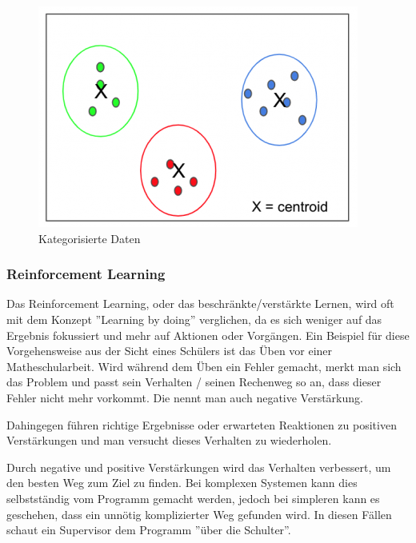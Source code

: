 \begin{figure}[H]
    \centering
    \includegraphics[scale=0.8]{sections/machine-learning/images/clustered-data.png}
    \caption{Kategorisierte Daten}
    \label{fig:clustered-data}
\end{figure}

\subsubsection{Reinforcement Learning}

Das Reinforcement Learning, oder das beschränkte/verstärkte Lernen, wird oft mit dem Konzept ''Learning by doing'' verglichen, da es sich weniger auf das Ergebnis fokussiert und mehr auf Aktionen oder Vorgängen. Ein Beispiel für diese Vorgehensweise aus der Sicht eines Schülers ist das Üben vor einer Matheschularbeit. Wird während dem Üben ein Fehler gemacht, merkt man sich das Problem und passt sein Verhalten / seinen Rechenweg so an, dass dieser Fehler nicht mehr vorkommt. Die nennt man auch negative Verstärkung. \cite{SL:online}

Dahingegen führen richtige Ergebnisse oder erwarteten Reaktionen zu positiven Verstärkungen und man versucht dieses Verhalten zu wiederholen.

Durch negative und positive Verstärkungen wird das Verhalten verbessert, um den besten Weg zum Ziel zu finden. Bei komplexen Systemen kann dies selbstständig vom Programm gemacht werden, jedoch bei simpleren kann es geschehen, dass ein unnötig komplizierter Weg gefunden wird. In diesen Fällen schaut ein Supervisor dem Programm ''über die Schulter''.
